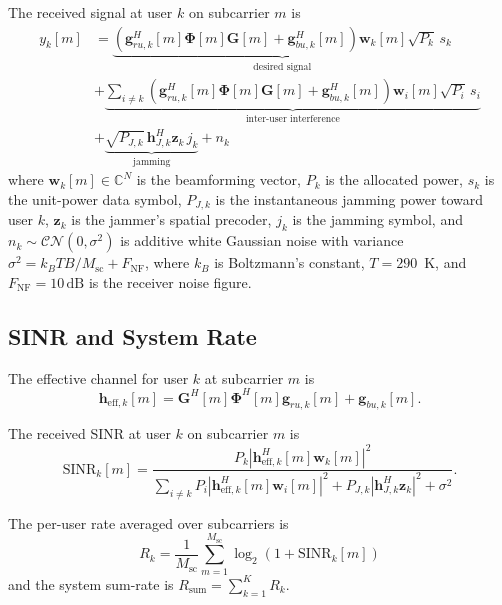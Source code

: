 \documentclass[journal,twocolumn]{IEEEtran}
\newcommand{\vect}[1]{\mathbf{#1}}
\newcommand{\mat}[1]{\mathbf{#1}}
\newcommand{\C}{\mathbb{C}}
\begin{document}
The received signal at user $k$ on subcarrier $m$ is
\begin{align}
y_k[m] &= \underbrace{\left(\vect{g}_{ru,k}^H[m]\bm{\Phi}[m]\mat{G}[m] + \vect{g}_{bu,k}^H[m]\right)\vect{w}_k[m]\sqrt{P_k}\,s_k}_{\text{desired signal}} \nonumber\\
&+ \underbrace{\sum_{i \neq k}\left(\vect{g}_{ru,k}^H[m]\bm{\Phi}[m]\mat{G}[m] + \vect{g}_{bu,k}^H[m]\right)\vect{w}_i[m]\sqrt{P_i}\,s_i}_{\text{inter-user interference}} \nonumber\\
&+ \underbrace{\sqrt{P_{J,k}}\,\vect{h}_{J,k}^H\vect{z}_k\,j_k}_{\text{jamming}} + n_k \label{eq:signal}
\end{align}
where $\vect{w}_k[m] \in \C^{N}$ is the beamforming vector, $P_k$ is the allocated power, $s_k$ is the unit-power data symbol, $P_{J,k}$ is the instantaneous jamming power toward user $k$, $\vect{z}_k$ is the jammer's spatial precoder, $j_k$ is the jamming symbol, and $n_k \sim \mathcal{CN}(0, \sigma^2)$ is additive white Gaussian noise with variance $\sigma^2 = k_B T B / M_{\text{sc}} + F_{\text{NF}}$, where $k_B$ is Boltzmann's constant, $T = 290$~K, and $F_{\text{NF}} = 10\,\text{dB}$ is the receiver noise figure.

\subsection{SINR and System Rate}

The effective channel for user $k$ at subcarrier $m$ is
\begin{equation}
\vect{h}_{\text{eff},k}[m] = \mat{G}^H[m]\bm{\Phi}^H[m]\vect{g}_{ru,k}[m] + \vect{g}_{bu,k}[m].
\label{eq:heff}
\end{equation}

The received SINR at user $k$ on subcarrier $m$ is
\begin{equation}
\text{SINR}_k[m] = \frac{P_k |\vect{h}_{\text{eff},k}^H[m]\vect{w}_k[m]|^2}{\displaystyle\sum_{i \neq k}P_i|\vect{h}_{\text{eff},k}^H[m]\vect{w}_i[m]|^2 + P_{J,k}|\vect{h}_{J,k}^H\vect{z}_k|^2 + \sigma^2}.
\label{eq:sinr}
\end{equation}

The per-user rate averaged over subcarriers is
\begin{equation}
R_k = \frac{1}{M_{\text{sc}}}\sum_{m=1}^{M_{\text{sc}}} \log_2(1 + \text{SINR}_k[m])
\label{eq:rate}
\end{equation}
and the system sum-rate is $R_{\text{sum}} = \sum_{k=1}^{K} R_k$.
\end{document}
